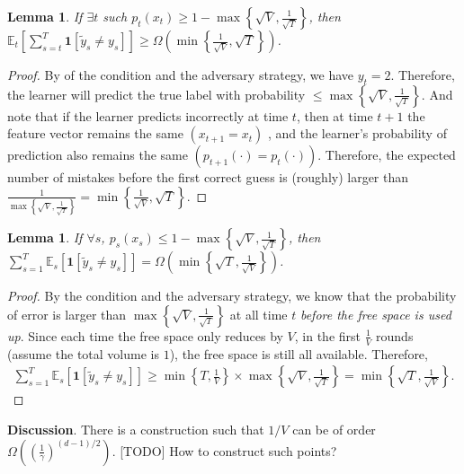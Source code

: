 \documentclass{article}
\newcommand{\one}{\boldsymbol{1}}
\newcommand{\field}[1]{\mathbb{#1}}
\newcommand{\E}{\field{E}}
\newtheorem{lemma}[theorem]{Lemma}
\begin{document}
\begin{lemma}
If $\exists t$ such $p_t(x_t)\geq 1-\max\left\{ \sqrt{V}, \frac{1}{\sqrt{T}} \right\}$, then $\E_t\left[ \sum_{s=t}^T  \one[\tilde{y}_s\neq y_s] \right] \geq \Omega\left(\min\left\{\frac{1}{\sqrt{V}},\sqrt{T}\right\}\right)$.
\end{lemma}
\begin{proof}
By of the condition and the adversary strategy, we have $y_t=2$. Therefore, the learner will predict the true label with probability $\leq \max \left\{ \sqrt{V}, \frac{1}{\sqrt{T}} \right\}$. And note that if the learner predicts incorrectly at time $t$, then at time $t+1$ the feature vector remains the same $(x_{t+1}=x_t)$ , and the learner's probability of prediction also remains the same $(p_{t+1}(\cdot)=p_t(\cdot))$. Therefore, the expected number of mistakes before the first correct guess is (roughly) larger than  $\frac{1}{\max\left\{\sqrt{V}, \frac{1}{\sqrt{T}}\right\}}=\min\left\{\frac{1}{\sqrt{V}}, \sqrt{T}\right\}$. 
\end{proof}

\begin{lemma}
If $\forall s$, $p_s(x_s)\leq 1-\max\left\{\sqrt{V}, \frac{1}{\sqrt{T}}\right\}$, then $\sum_{s=1}^T \E_s[\one[\tilde{y}_s\neq y_s]] = \Omega\left(\min\left\{\sqrt{T}, \frac{1}{\sqrt{V}}\right\}\right)$.
\end{lemma}

\begin{proof}
By the condition and the adversary strategy, we know that the probability of error is larger than $\max\left\{\sqrt{V},\frac{1}{\sqrt{T}}\right\}$ at all time $t$ \textit{before the free space is used up}. Since each time the free space only reduces by $V$, in the first $\frac{1}{V}$ rounds (assume the total volume is $1$), the free space is still all available. Therefore, 
\begin{align*}
    \sum_{s=1}^T \E_s[\one[\tilde{y}_s\neq y_s]] \geq \min\left\{ T,\frac{1}{V} \right\}\times \max\left\{ \sqrt{V}, \frac{1}{\sqrt{T}} \right\}=\min\left\{\sqrt{T}, \frac{1}{\sqrt{V}}\right\}. 
\end{align*}
\end{proof}

\textbf{Discussion}. There is a construction such that $1/V$ can be of order $\Omega\left( \left(\frac{1}{\gamma}\right)^{(d-1)/2} \right)$. {\color{red} [TODO] How to construct such points?}

\end{document}
